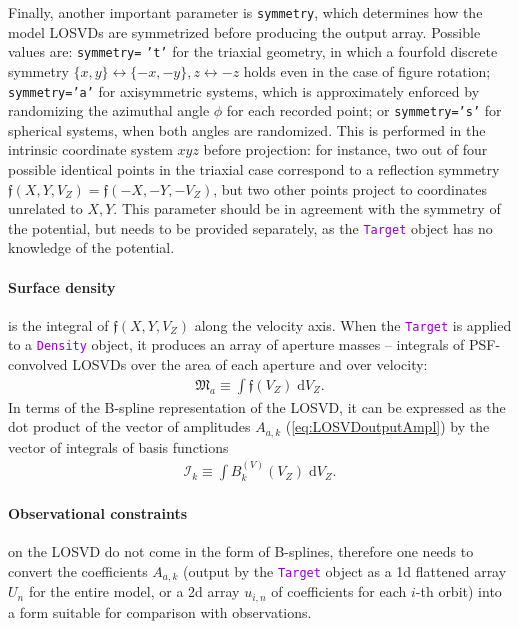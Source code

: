 \documentclass[12pt]{article}
\newcommand{\ttt}[1]{\textcolor{darkviolet}{\texttt{#1}}}
\newcommand{\ppp}[1]{\textcolor{darkolive} {\texttt{#1}}}
\renewcommand{\d}{\mathrm{d}}
\let\oldparagraph\paragraph
\renewcommand{\paragraph}[1]{\vspace{-2mm}\oldparagraph{#1}}
\begin{document}
Finally, another important parameter is \ppp{symmetry}, which determines how the model LOSVDs are symmetrized before producing the output array. Possible values are: \ppp{symmetry=} \ppp{'t'} for the triaxial geometry, in which a fourfold discrete symmetry $\{x,y\}\leftrightarrow \{-x,-y\}, z \leftrightarrow -z$ holds even in the case of figure rotation; \ppp{symmetry='a'} for axisymmetric systems, which is approximately enforced by randomizing the azimuthal angle $\phi$ for each recorded point; or \ppp{symmetry='s'} for spherical systems, when both angles are randomized. This is performed in the intrinsic coordinate system $xyz$ before projection: for instance, two out of four possible identical points in the triaxial case correspond to a reflection symmetry $\mathfrak{f}(X,Y,V_Z) = \mathfrak{f}(-X,-Y,-V_Z)$, but two other points project to coordinates unrelated to $X,Y$. This parameter should be in agreement with the symmetry of the potential, but needs to be provided separately, as the \ttt{Target} object has no knowledge of the potential.

\paragraph{Surface density} is the integral of $\mathfrak{f}(X,Y,V_Z)$ along the velocity axis. When the \ttt{Target} is applied to a \ttt{Density} object, it produces an array of aperture masses -- integrals of PSF-convolved LOSVDs over the area of each aperture and over velocity:
\begin{align}  \label{eq:ApertureMass}
\mathfrak M_a \equiv \int \mathfrak{f}(V_Z)\; \d V_Z .
\end{align}
In terms of the B-spline representation of the LOSVD, it can be expressed as the dot product of the vector of amplitudes $A_{a,k}$ (\ref{eq:LOSVDoutputAmpl}) by the vector of integrals of basis functions
\begin{align}  \label{eq:BsplineIntegrals}
\mathcal I_k \equiv \int B_k^{(V)}(V_Z)\; \d V_Z .
\end{align}

\paragraph{Observational constraints} on the LOSVD do not come in the form of B-splines, therefore one needs to convert the coefficients $A_{a,k}$ (output by the \ttt{Target} object as  a 1d flattened array $U_n$ for the entire model, or a 2d array $u_{i,n}$ of coefficients for each $i$-th orbit) into a form suitable for comparison with observations.
\end{document}
